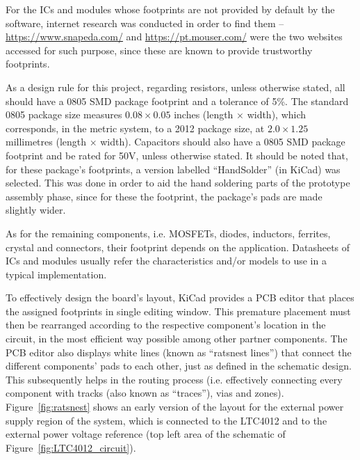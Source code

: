 For the ICs and modules whose footprints are not provided by default by the software, internet research was conducted in order to find them -- \url{https://www.snapeda.com/} and \url{https://pt.mouser.com/} were the two websites accessed for such purpose, since these are known to provide trustworthy footprints.

As a design rule for this project, regarding resistors, unless otherwise stated, all should have a 0805 \gls{SMD} package footprint and a tolerance of 5\%. The standard 0805 package size measures $0.08 \times 0.05$ inches (length $\times$ width), which corresponds, in the metric system, to a 2012 package size, at $2.0 \times 1.25$ millimetres (length $\times$ width).
Capacitors should also have a 0805 SMD package footprint and be rated for 50V, unless otherwise stated. It should be noted that, for these package's footprints, a version labelled ``HandSolder'' (in KiCad) was selected. This was done in order to aid the hand soldering parts of the prototype assembly phase, since for these the footprint, the package's pads are made slightly wider.

As for the remaining components, i.e. MOSFETs, diodes, inductors, ferrites, crystal and connectors, their footprint depends on the application.
Datasheets of ICs and modules usually refer the characteristics and/or models to use in a typical implementation.

To effectively design the board's layout, KiCad provides a PCB editor that places the assigned footprints in single editing window. This premature placement must then be rearranged according to the respective component's location in the circuit, in the most efficient way possible among other partner components. The PCB editor also displays white lines (known as ``ratsnest lines'') that connect the different components' pads to each other, just as defined in the schematic design. This subsequently helps in the routing process (i.e. effectively connecting every component with tracks (also known as ``traces''), vias and zones). Figure~\ref{fig:ratsnest} shows an early version of the layout for the external power supply region of the system, which is connected to the LTC4012 and to the external power voltage reference (top left area of the schematic of Figure~\ref{fig:LTC4012_circuit}).

